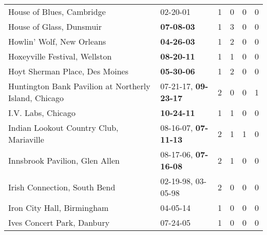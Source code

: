 \begin{longtable}{p{}p{}p{}p{}p{}p{}}
                                                    House of Blues, Cambridge &                                                02-20-01\textsuperscript{} &  1 &  0 &  0 &  0 \\
                                                     House of Glass, Dunsmuir &                                       \textbf{07-08-03\textsuperscript{}} &  1 &  3 &  0 &  0 \\
                                                    Howlin' Wolf, New Orleans &                                       \textbf{04-26-03\textsuperscript{}} &  1 &  2 &  0 &  0 \\
                                                Hoxeyville Festival, Wellston &                                       \textbf{08-20-11\textsuperscript{}} &  1 &  1 &  0 &  0 \\
                                               Hoyt Sherman Place, Des Moines &                                       \textbf{05-30-06\textsuperscript{}} &  1 &  2 &  0 &  0 \\
                        Huntington Bank Pavilion at Northerly Island, Chicago &           07-21-17\textsuperscript{}, \textbf{09-23-17\textsuperscript{}} &  2 &  0 &  0 &  1 \\
                                                           I.V. Labs, Chicago &                                       \textbf{10-24-11\textsuperscript{}} &  1 &  1 &  0 &  0 \\
                                      Indian Lookout Country Club, Mariaville &           08-16-07\textsuperscript{}, \textbf{07-11-13\textsuperscript{}} &  2 &  1 &  1 &  0 \\
                                               Innsbrook Pavilion, Glen Allen &           08-17-06\textsuperscript{}, \textbf{07-16-08\textsuperscript{}} &  2 &  1 &  0 &  0 \\
                                                 Irish Connection, South Bend &                    02-19-98\textsuperscript{}, 03-05-98\textsuperscript{} &  2 &  0 &  0 &  0 \\
                                                   Iron City Hall, Birmingham &                                                04-05-14\textsuperscript{} &  1 &  0 &  0 &  0 \\
                                                   Ives Concert Park, Danbury &                                                07-24-05\textsuperscript{} &  1 &  0 &  0 &  0 \\

\end{longtable}
